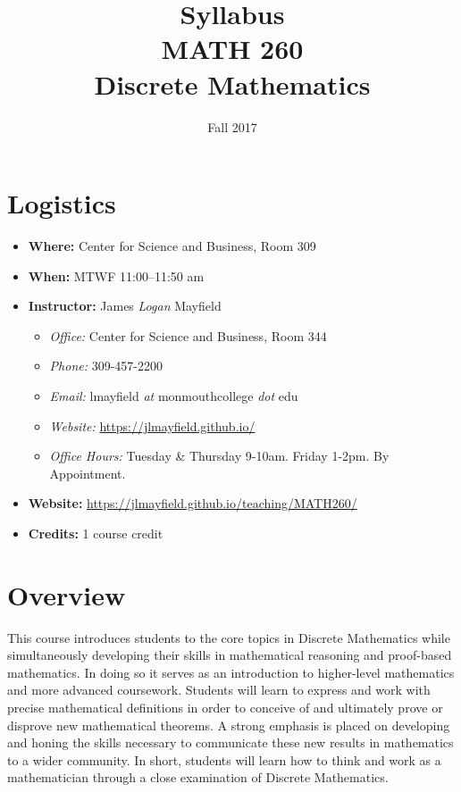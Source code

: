\documentclass[nobib]{tufte-handout}
\title{Syllabus \\ MATH 260 \\ Discrete Mathematics}
\author{}
\date{ Fall 2017 }
\begin{document}
\maketitle

\section{Logistics}
\begin{itemize}
\item \textbf{Where: } Center for Science and Business, Room 309
\item \textbf{When: } MTWF 11:00--11:50 am
\item \textbf{Instructor:} James \textit{Logan} Mayfield
\begin{itemize}
\item \textit{Office: } Center for Science and Business, Room 344
\item \textit{Phone: } 309-457-2200 %
\item \textit{Email: } lmayfield \textit{at} monmouthcollege \textit{dot} edu
\item \textit{Website: } \url{https://jlmayfield.github.io/}
\item \textit{Office Hours: } Tuesday \& Thursday 9-10am. Friday 1-2pm. By Appointment.
\end{itemize}
\item \textbf{Website: } \url{https://jlmayfield.github.io/teaching/MATH260/}
\item \textbf{Credits: } 1 course credit
\end{itemize}

\section{Overview}

This course introduces students to the core topics in Discrete Mathematics while simultaneously developing their skills in mathematical reasoning and proof-based mathematics. In doing so it serves as an introduction to higher-level mathematics and more advanced coursework. Students will learn to express and work with precise mathematical definitions in order to  conceive of and ultimately prove or disprove new mathematical theorems.  A strong emphasis is placed on developing and honing the skills necessary to communicate these new results in mathematics to a wider community.  In short, students will learn how to think and work as a mathematician through a close examination of Discrete Mathematics.
\end{document}
